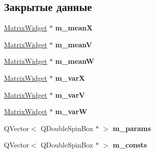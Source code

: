 \subsection*{Закрытые данные}
\begin{DoxyCompactItemize}
\item 
\hyperlink{class_matrix_widget}{Matrix\+Widget} $\ast$ {\bfseries m\+\_\+meanX}\hypertarget{class_task_parameters_widget_ac36859f80fae601b1a32a8c42e86f742}{}\label{class_task_parameters_widget_ac36859f80fae601b1a32a8c42e86f742}

\item 
\hyperlink{class_matrix_widget}{Matrix\+Widget} $\ast$ {\bfseries m\+\_\+meanV}\hypertarget{class_task_parameters_widget_a3c354b8ddd6fe09355c8821b4b522887}{}\label{class_task_parameters_widget_a3c354b8ddd6fe09355c8821b4b522887}

\item 
\hyperlink{class_matrix_widget}{Matrix\+Widget} $\ast$ {\bfseries m\+\_\+meanW}\hypertarget{class_task_parameters_widget_ac14cb83595acb2c63fe24ccde0c1d3bb}{}\label{class_task_parameters_widget_ac14cb83595acb2c63fe24ccde0c1d3bb}

\item 
\hyperlink{class_matrix_widget}{Matrix\+Widget} $\ast$ {\bfseries m\+\_\+varX}\hypertarget{class_task_parameters_widget_a758d6df3d1413839119f412bd32a0ec1}{}\label{class_task_parameters_widget_a758d6df3d1413839119f412bd32a0ec1}

\item 
\hyperlink{class_matrix_widget}{Matrix\+Widget} $\ast$ {\bfseries m\+\_\+varV}\hypertarget{class_task_parameters_widget_a1135f640b291c25931f0f919a97487d0}{}\label{class_task_parameters_widget_a1135f640b291c25931f0f919a97487d0}

\item 
\hyperlink{class_matrix_widget}{Matrix\+Widget} $\ast$ {\bfseries m\+\_\+varW}\hypertarget{class_task_parameters_widget_a94e809377fb4de3f4f61b30e38fcbf12}{}\label{class_task_parameters_widget_a94e809377fb4de3f4f61b30e38fcbf12}

\item 
Q\+Vector$<$ Q\+Double\+Spin\+Box $\ast$ $>$ {\bfseries m\+\_\+params}\hypertarget{class_task_parameters_widget_a2fac0e19d14d82f45532ca2f328cadd8}{}\label{class_task_parameters_widget_a2fac0e19d14d82f45532ca2f328cadd8}

\item 
Q\+Vector$<$ Q\+Double\+Spin\+Box $\ast$ $>$ {\bfseries m\+\_\+consts}\hypertarget{class_task_parameters_widget_aefe5f25cdbc68d21a95b915a39352f51}{}\label{class_task_parameters_widget_aefe5f25cdbc68d21a95b915a39352f51}

\end{DoxyCompactItemize}


